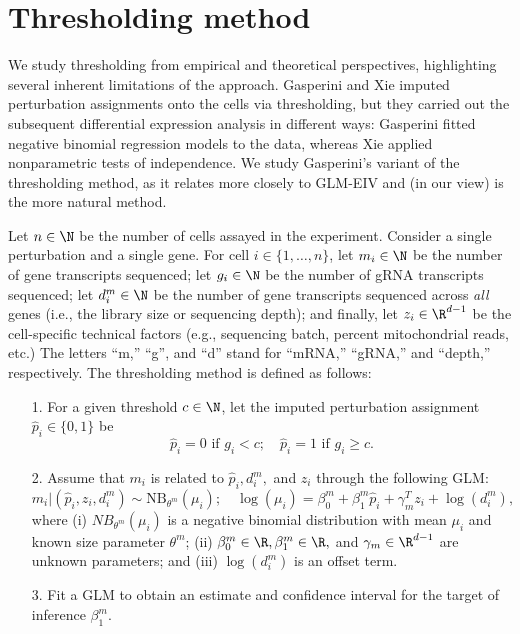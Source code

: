 \documentclass[11pt]{article}
\begin{document}
\section{Thresholding method}
We study thresholding from empirical and theoretical perspectives, highlighting several inherent limitations of the approach. Gasperini and Xie imputed perturbation assignments onto the cells via thresholding, but they carried out the subsequent differential expression analysis in different ways: Gasperini fitted negative binomial regression models to the data, whereas Xie applied nonparametric tests of independence. We study Gasperini's variant of the thresholding method, as it relates more closely to GLM-EIV and (in our view) is the more natural method.

Let $n \in \N$ be the number of cells assayed in the experiment. Consider a single perturbation and a single gene. For cell $i \in \{1, \dots, n\}$, let $m_i \in \N$ be the number of gene transcripts sequenced; let $g_i \in \N$ be the number of gRNA transcripts sequenced; let $d^m_i \in \N$ be the number of gene transcripts sequenced across \textit{all} genes (i.e., the library size or sequencing depth); and finally, let $z_i \in \R^{d-1}$ be the cell-specific technical factors (e.g., sequencing batch, percent mitochondrial reads, etc.) The letters ``m,'' ``g'', and ``d'' stand for ``mRNA,'' ``gRNA,'' and ``depth,'' respectively. The thresholding method is defined as follows:
\begin{itemize}
\item[1.] For a given threshold $c \in \N$, let the imputed perturbation assignment $\hat{p}_i \in \{0, 1\}$ be $$ \hat{p}_i = 0 \textrm{ if } g_i < c; \quad \hat{p}_i = 1 \textrm{ if } g_i \geq c.$$
\item[2.] Assume that $m_i$ is related to $\hat{p}_i, d^m_i,$ and $z_i$ through the following GLM:
\begin{equation}\label{thresh_glm}
m_i | (\hat{p}_i, z_i, d^m_i) \sim \textrm{NB}_{\theta^m}(\mu_i); \quad
\log(\mu_i) = \beta^m_0 + \beta^m_1 \hat{p}_i + \gamma^T_m z_i + \log\left(d_i^m\right),
\end{equation}
where (i) $NB_{\theta^m}(\mu_i)$ is a negative binomial distribution with mean $\mu_i$ and known size parameter $\theta^m$; (ii) $\beta^m_0 \in \R, \beta^m_1 \in \R,$ and $\gamma_m \in  \R^{d-1}$ are unknown parameters; and (iii) $\log(d_i^m)$ is an offset term.

\item[3.]  Fit a GLM to obtain an estimate and confidence interval for the target of inference $\beta^m_1$.
\end{itemize}
\end{document}
